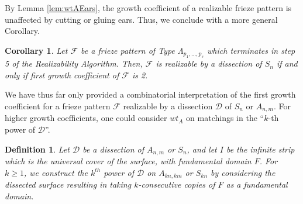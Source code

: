 \documentclass[12pt]{article}
\newtheorem{definition}{Definition}
\newtheorem{corollary}{Corollary}
\theoremstyle{remark}
\newcommand*{\D}{\mathcal{D}}
\begin{document}
By Lemma \ref{lem:wtAEars}, the growth coefficient of a realizable frieze pattern is unaffected by cutting or gluing ears. Thus, we conclude with a more general Corollary. 

\begin{corollary}\label{cor:GrCoAllFrieze}
Let $\mathcal{F}$ be a frieze pattern of Type $\Lambda_{p_1,\ldots,p_s}$ which terminates in step 5 of the Realizability Algorithm. Then, $\mathcal{F}$ is realizable by a dissection of $S_n$ if and only if first growth coefficient of $\mathcal{F}$ is 2. 
\end{corollary}

We have thus far only provided a combinatorial interpretation of the first growth coefficient for a frieze pattern $\mathcal{F}$ realizable by a dissection $\D$ of $S_n$ or $A_{n,m}$. For higher growth coefficients, one could consider $wt_A$ on matchings in the ``$k$-th power of $\D$''.


\begin{definition}\label{def:kthpower}
Let $\D$ be a dissection of $A_{n,m}$ or $S_n$, and let $I$ be the infinite strip which is the universal cover of the surface, with fundamental domain $F$. For $k \geq 1$, we construct \emph{the $k^{th}$ power of $\D$ on $A_{kn,km}$ or $S_{kn}$} by considering the dissected surface resulting in taking $k$-consecutive copies of $F$ as a fundamental domain. 
\end{definition}
\end{document}
